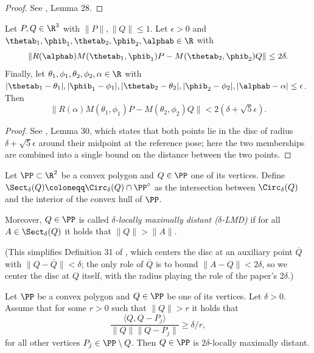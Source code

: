\begin{proof}
\leanok
See \cite{polyhedron.without.rupert}, Lemma 28.
\end{proof}

\begin{lemma} \label{lem:inCirc}
  \leanok
    Let $P, Q \in \R^3$ with $\|P\|, \|Q\| \leq 1$. Let $\epsilon>0$ and $\thetab_1,\phib_1,\thetab_2,\phib_2,\alphab \in \R$ with
    \[
        \|R(\alphab) M(\thetab_1, \phib_1) P - M(\thetab_2, \phib_2) Q\| \leq 2\delta.
    \]
    Finally, let $\theta_1, \phi_1, \theta_2, \phi_2, \alpha \in \R$ with $|\thetab_1-\theta_1|, |\phib_1 - \phi_1|, |\thetab_2-\theta_2|, |\phib_2-\phi_2|, |\alphab - \alpha| \leq \epsilon$. Then
    \[
        \|R(\alpha)M(\theta_1, \phi_1) P - M(\theta_2, \phi_2) Q\| < 2(\delta + \sqrt{5} \epsilon).
    \]
\end{lemma}

\begin{proof}
\leanok
See \cite{polyhedron.without.rupert}, Lemma 30, which states that both points lie in the disc of radius $\delta + \sqrt{5}\epsilon$ around their midpoint at the reference pose; here the two memberships are combined into a single bound on the distance between the two points.
\end{proof}

\begin{definition}
  \label{def:LMD}
  \leanok
    Let $\PP \subset \R^2$ be a convex polygon and $Q \in \PP$ one of its vertices. Define $\Sect_\delta(Q) \coloneqq \Circ_{\delta}(Q) \cap \PP^\circ$ as the intersection between $\Circ_{\delta}(Q)$ and the interior of the convex hull of $\PP$.

    Moreover, $Q \in \PP$ is called \emph{$\delta$-locally maximally distant ($\delta$-LMD)} if for all $A \in \Sect_\delta(Q)$ it holds that $\|Q\| > \|A\|$.

    (This simplifies Definition 31 of \cite{polyhedron.without.rupert}, which centers the disc at an auxiliary point $\overline{Q}$ with $\|Q - \overline{Q}\| < \delta$; the only role of $\overline{Q}$ is to bound $\|A - Q\| < 2\delta$, so we center the disc at $Q$ itself, with the radius playing the role of the paper's $2\delta$.)
\end{definition}

\begin{lemma} \label{lem:LMD}
  \leanok
    Let $\PP$ be a convex polygon and $Q \in \PP$ be one of its vertices. Let $\delta > 0$. Assume that for some $r > 0 $ such that $\|Q\| > r$ it holds that
    \[
        \frac{\langle Q, Q - P_j \rangle}{\|Q\|\|Q - P_j\|} \geq \delta/r,
    \]
    for all other vertices $P_j \in \PP \setminus Q$. Then $Q \in \PP$ is $2\delta$-locally maximally distant.
\end{lemma}

